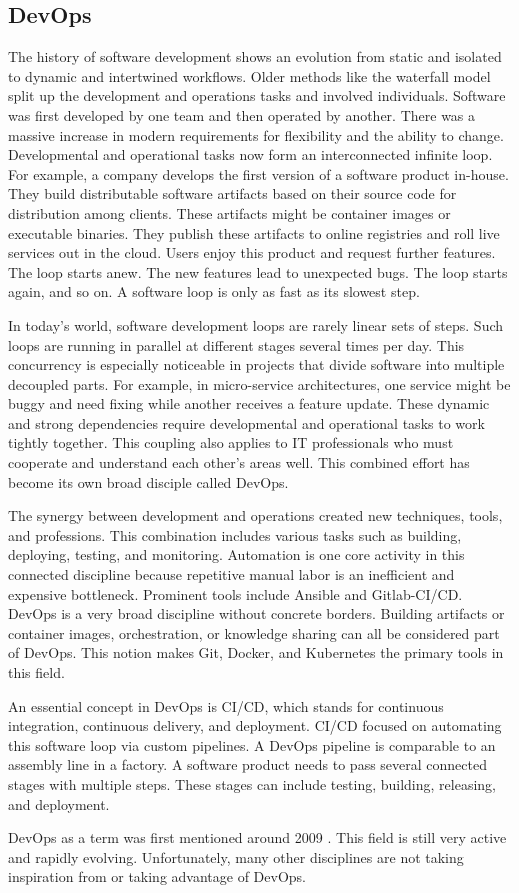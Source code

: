 
\subsection{DevOps}

The history of software development shows an evolution from static and isolated to dynamic and intertwined workflows.
Older methods like the waterfall model split up the development and operations tasks and involved individuals.
Software was first developed by one team and then operated by another.
There was a massive increase in modern requirements for flexibility and the ability to change.
Developmental and operational tasks now form an interconnected infinite loop.
For example, a company develops the first version of a software product in-house.
They build distributable software artifacts based on their source code for distribution among clients.
These artifacts might be container images or executable binaries.
They publish these artifacts to online registries and roll live services out in the cloud.
Users enjoy this product and request further features.
The loop starts anew.
The new features lead to unexpected bugs.
The loop starts again, and so on.
A software loop is only as fast as its slowest step.

In today's world, software development loops are rarely linear sets of steps.
Such loops are running in parallel at different stages several times per day.
This concurrency is especially noticeable in projects that divide software into multiple decoupled parts.
For example, in micro-service architectures, one service might be buggy and need fixing while another receives a feature update.
These dynamic and strong dependencies require developmental and operational tasks to work tightly together.
This coupling also applies to IT professionals who must cooperate and understand each other's areas well.
This combined effort has become its own broad disciple called DevOps.

The synergy between development and operations created new techniques, tools, and professions.
This combination includes various tasks such as building, deploying, testing, and monitoring.
Automation is one core activity in this connected discipline because repetitive manual labor is an inefficient and expensive bottleneck.
Prominent tools include Ansible and Gitlab-CI/CD.
DevOps is a very broad discipline without concrete borders.
Building artifacts or container images, orchestration, or knowledge sharing can all be considered part of DevOps.
This notion makes Git, Docker, and Kubernetes the primary tools in this field.

An essential concept in DevOps is CI/CD, which stands for continuous integration, continuous delivery, and deployment.
CI/CD focused on automating this software loop via custom pipelines.
A DevOps pipeline is comparable to an assembly line in a factory.
A software product needs to pass several connected stages with multiple steps.
These stages can include testing, building, releasing, and deployment.

DevOps as a term was first mentioned around 2009 \cite{paper:mlops}.
This field is still very active and rapidly evolving.
Unfortunately, many other disciplines are not taking inspiration from or taking advantage of DevOps.

